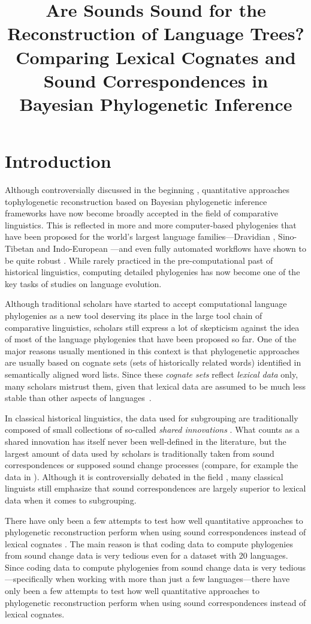 \documentclass[10pt, a4paper]{article}
\title{Are Sounds Sound for the Reconstruction of Language Trees? Comparing Lexical Cognates and Sound Correspondences in Bayesian Phylogenetic Inference}
\begin{document}
\maketitleabstract%
%
\section{Introduction}

Although controversially discussed in the beginning \citep{Holm2007}, quantitative approaches tophylogenetic reconstruction based on Bayesian phylogenetic inference frameworks have now become broadly accepted in the field of comparative linguistics. This is reflected in more and more computer-based phylogenies that have been proposed for the world's largest language families---Dravidian \citep{Kolipakam2018}, Sino-Tibetan \citep{Sagart2019} and Indo-European \citep{bouckaert2012mapping}---and even fully automated workflows have shown to be quite robust \citep{rama2018automatic}.  While rarely practiced in the pre-computational past of historical linguistics, computing detailed phylogenies has now become one of the key tasks of studies on language evolution.


Although traditional scholars have started to accept computational language phylogenies as a new tool deserving its place in the large tool chain of comparative linguistics, scholars still express a lot of skepticism against the idea of most of the language phylogenies that have been proposed so far. One of the major reasons usually mentioned in this context is that phylogenetic approaches are usually based on cognate sets (sets of historically related words) identified in semantically aligned word lists. Since these \emph{cognate sets} reflect \emph{lexical data} only, many scholars mistrust them, given that lexical data are assumed to be much less stable than other aspects of languages~\cite{CampbellPoser2008}.
 
In classical historical linguistics, the data used for subgrouping are traditionally composed of small collections of so-called \emph{shared innovations} \citep{Dyen1953}. What counts as a shared innovation has itself never been well-defined in the literature, but the largest amount of data used by scholars is traditionally taken from sound correspondences or supposed sound change processes (compare, for example the data in \citealt[305]{Anttila1972}). Although it is controversially debated in the field \citep{Ringe2002,Dybo2008}, many classical linguists still emphasize that sound correspondences are largely superior to lexical data when it comes to subgrouping.

There have only been a few attempts to test how well quantitative approaches to phylogenetic reconstruction perform when using sound correspondences instead of lexical cognates \citep{Chacon2015a}. The main reason is that coding data to compute phylogenies from sound change data is very tedious even for a dataset with 20 languages.  Since coding data to compute phylogenies from sound change data is very tedious---specifically when working with more than just a few languages---there have only been a few attempts to test how well quantitative approaches to phylogenetic reconstruction perform when using sound correspondences instead of lexical cognates.
\end{document}
